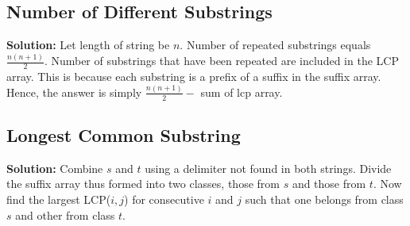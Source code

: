 \documentclass{article}
\begin{document}
	\subsection{Number of Different Substrings}
	\begin{algorithm}[H]
		\SetAlgoLined
		\caption{Problem: Number of Different Substrings}
	\end{algorithm}	
	\vspace{3mm}
	\textbf{Solution:} Let length of string be $n$. Number of repeated substrings equals $\frac{n (n+1)}{2}$. Number of substrings that have been repeated are included in the LCP array. This is because each substring is a prefix of a suffix in the suffix array. Hence, the answer is simply $\frac{n(n+1)}{2} -$ sum of lcp array.
	
		\subsection{Longest Common Substring}
	\begin{algorithm}[H]
		\SetAlgoLined
		\caption{Problem: Longest Common Substring}
	\end{algorithm}	
	\vspace{3mm}
	\textbf{Solution:} Combine $s$ and $t$ using a delimiter not found in both strings. Divide the suffix array thus formed into two classes, those from $s$ and those from $t$. Now find the largest LCP($i,j$) for consecutive $i$ and $j$ such that one belongs from class $s$ and other from class $t$.
\end{document}
